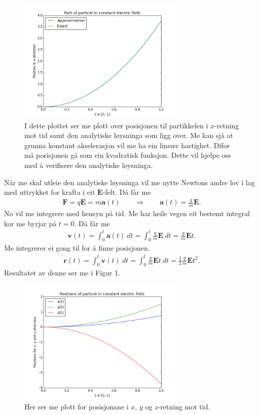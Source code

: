 \documentclass[11pt, a4paper]{article}
\begin{document}
  \begin{figure}[H]
    \centering
    \includegraphics[width=300px]{A.png}
    \caption{I dette plottet ser me plott over posisjonen til partikkelen i $x$-retning mot 
    tid samt den analytiske løysninga som ligg over.
    Me kan sjå at grunna konstant akselerasjon vil me ha ein lineær hastighet. Difor må 
    posisjonen gå som ein kvadratisk funksjon. Dette vil hjelpe oss med å verifisere den 
    analytiske løysninga.}
  \end{figure}
  Når me skal utleie den analytiske løysninga vil me nytte Newtons andre lov i lag med uttrykket for krafta i eit $\mathbf{E}$-felt. Då får me
  \begin{align*}
    \mathbf{F} = q\mathbf{E} = m\mathbf{a}(t) \qquad \Rightarrow \qquad \mathbf{a}(t) = \frac{q}{m}\mathbf{E}.
  \end{align*}
  No vil me integrere med hensyn på tid. Me har heile vegen eit bestemt integral kor me byrjar på $t = 0$. Då får me
  \begin{align*}
    \mathbf{v}(t) = \int_0^t\mathbf{a}(t) \ dt = \int_0^t \frac{q}{m}\mathbf{E} \ dt = \frac{q}{m}\mathbf{E}t.
  \end{align*}
  Me integrerer ei gong til for å finne posisjonen.
  \begin{align*}
    \mathbf{r}(t) = \int_0^t\mathbf{v}(t) \ dt = \int_0^t \frac{q}{m}\mathbf{E}t \ dt = \frac{1}{2}\frac{q}{m}\mathbf{E}t^2.
  \end{align*}
  Resultatet av denne ser me i Figur 1.

  \begin{figure}[H]
    \centering
    \includegraphics[width=300px]{C1.png}
    \caption{Her ser me plott for posisjonane i $x$, $y$ og $z$-retning mot tid.}
  \end{figure}
\end{document}

